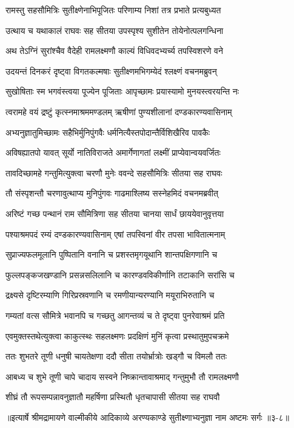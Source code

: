 
\twolineshloka
{रामस्तु सहसौमित्रिः सुतीक्ष्णेनाभिपूजितः}
{परिणाम्य निशां तत्र प्रभाते प्रत्यबुध्यत} %

\twolineshloka
{उत्थाय च यथाकालं राघवः सह सीतया}
{उपस्पृश्य सुशीतेन तोयेनोत्पलगन्धिना} %

\twolineshloka
{अथ तेऽग्निं सुरांश्चैव वैदेही रामलक्ष्मणौ}
{काल्यं विधिवदभ्यर्च्य तपस्विशरणे वने} %

\twolineshloka
{उदयन्तं दिनकरं दृष्ट्वा विगतकल्मषाः}
{सुतीक्ष्णमभिगम्येदं श्लक्ष्णं वचनमब्रुवन्} %

\twolineshloka
{सुखोषिताः स्म भगवंस्त्वया पूज्येन पूजिताः}
{आपृच्छामः प्रयास्यामो मुनयस्त्वरयन्ति नः} %

\twolineshloka
{त्वरामहे वयं द्रष्टुं कृत्स्नमाश्रममण्डलम्}
{ऋषीणां पुण्यशीलानां दण्डकारण्यवासिनाम्} %

\twolineshloka
{अभ्यनुज्ञातुमिच्छामः सहैभिर्मुनिपुंगवैः}
{धर्मनित्यैस्तपोदान्तैर्विशिखैरिव पावकैः} %

\twolineshloka
{अविषह्यातपो यावत् सूर्यो नातिविराजते}
{अमार्गेणागतां लक्ष्मीं प्राप्येवान्वयवर्जितः} %

\twolineshloka
{तावदिच्छामहे गन्तुमित्युक्त्वा चरणौ मुनेः}
{ववन्दे सहसौमित्रिः सीतया सह राघवः} %

\twolineshloka
{तौ संस्पृशन्तौ चरणावुत्थाप्य मुनिपुंगवः}
{गाढमाश्लिष्य सस्नेहमिदं वचनमब्रवीत्} %

\twolineshloka
{अरिष्टं गच्छ पन्थानं राम सौमित्रिणा सह}
{सीतया चानया सार्धं छाययेवानुवृत्तया} %

\twolineshloka
{पश्याश्रमपदं रम्यं दण्डकारण्यवासिनाम्}
{एषां तपस्विनां वीर तपसा भावितात्मनाम्} %

\twolineshloka
{सुप्राज्यफलमूलानि पुष्पितानि वनानि च}
{प्रशस्तमृगयूथानि शान्तपक्षिगणानि च} %

\twolineshloka
{फुल्लपङ्कजखण्डानि प्रसन्नसलिलानि च}
{कारण्डवविकीर्णानि तटाकानि सरांसि च} %

\twolineshloka
{द्रक्ष्यसे दृष्टिरम्याणि गिरिप्रस्रवणानि च}
{रमणीयान्यरण्यानि मयूराभिरुतानि च} %

\twolineshloka
{गम्यतां वत्स सौमित्रे भवानपि च गच्छतु}
{आगन्तव्यं च ते दृष्ट्वा पुनरेवाश्रमं प्रति} %

\twolineshloka
{एवमुक्तस्तथेत्युक्त्वा काकुत्स्थः सहलक्ष्मणः}
{प्रदक्षिणं मुनिं कृत्वा प्रस्थातुमुपचक्रमे} %

\twolineshloka
{ततः शुभतरे तूणी धनुषी चायतेक्षणा}
{ददौ सीता तयोर्भ्रात्रोः खड्गौ च विमलौ ततः} %

\twolineshloka
{आबध्य च शुभे तूणी चापे चादाय सस्वने}
{निष्क्रान्तावाश्रमाद् गन्तुमुभौ तौ रामलक्ष्मणौ} %

\twolineshloka
{शीघ्रं तौ रूपसम्पन्नावनुज्ञातौ महर्षिणा}
{प्रस्थितौ धृतचापासी सीतया सह राघवौ} %


॥इत्यार्षे श्रीमद्रामायणे वाल्मीकीये आदिकाव्ये अरण्यकाण्डे सुतीक्ष्णाभ्यनुज्ञा नाम अष्टमः सर्गः ॥३-८॥
